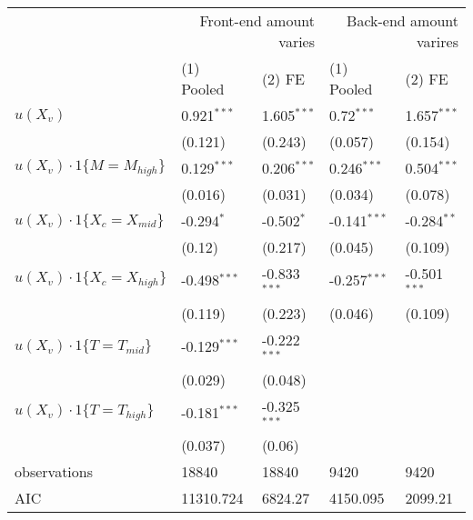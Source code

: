 \begin{tabular}{lllll}
\hline
 & \multicolumn{2}{r}{Front-end amount varies} & \multicolumn{2}{r}{Back-end amount varires} \\
 & (1) Pooled & (2) FE & (1) Pooled & (2) FE \\
\hline
$u(X_v)$ & 0.921$^{***}$ & 1.605$^{***}$ & 0.72$^{***}$ & 1.657$^{***}$ \\
 & (0.121) & (0.243) & (0.057) & (0.154) \\
$u(X_v)\cdot1\{M=M_{high}\}$ & 0.129$^{***}$ & 0.206$^{***}$ & 0.246$^{***}$ & 0.504$^{***}$ \\
 & (0.016) & (0.031) & (0.034) & (0.078) \\
$u(X_v)\cdot1\{X_c=X_{mid}\}$ & -0.294$^{*}$ & -0.502$^{*}$ & -0.141$^{***}$ & -0.284$^{**}$ \\
 & (0.12) & (0.217) & (0.045) & (0.109) \\
$u(X_v)\cdot1\{X_c=X_{high}\}$ & -0.498$^{***}$ & -0.833$^{***}$ & -0.257$^{***}$ & -0.501$^{***}$ \\
 & (0.119) & (0.223) & (0.046) & (0.109) \\
$u(X_v)\cdot1\{T=T_{mid}\}$ & -0.129$^{***}$ & -0.222$^{***}$ &  &  \\
 & (0.029) & (0.048) &  &  \\
$u(X_v)\cdot1\{T=T_{high}\}$ & -0.181$^{***}$ & -0.325$^{***}$ &  &  \\
 & (0.037) & (0.06) &  &  \\\hline

observations & 18840 & 18840 & 9420 & 9420 \\
AIC & 11310.724 & 6824.27 & 4150.095 & 2099.21 \\
\hline
\end{tabular}
